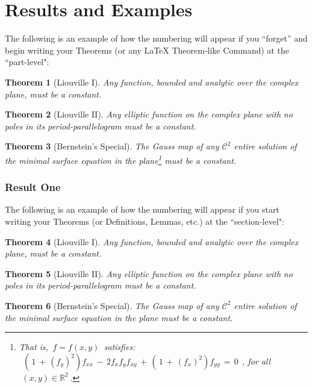 \documentclass[11pt]{gthesis2}  %
\newtheorem{theorem}{Theorem}[subsection]
\newcommand{\rtwo}{\ensuremath{\mathbb{R}^{2}}}
\begin{document}
\part{Results and Examples}
\label{part:rande}
%
The following is an example of how the numbering will appear if
you ``forget'' and begin writing your Theorems (or any \LaTeX\;
Theorem-like Command) at the ``part-level":
%
\begin{theorem}[Liouville I] Any function, bounded and analytic over the
complex plane, must be a constant.
\end{theorem}
%
\begin{theorem}[Liouville II] Any elliptic function on the complex
plane with no poles in its period-parallelogram must be a
constant.
\end{theorem}
%
\begin{theorem}[Bernstein's Special] The Gauss map of any
$\mathcal{C}^{2}$ entire solution of the minimal surface equation
in the plane\footnote{That is, $\,f = f(x,y)\,$ satisfies:
$\,\;(\,1\,+\, (f_{y})^{2})f_{xx}\, -\, 2f_{x}f_{y}f_{xy}
\,+\,(\,1\,+\, (f_{x})^{2})f_{yy} \,=\,0\,\;$, \;for all
$\,\,(x,y)\in\rtwo\,$.} must be a constant.
\end{theorem}
%
%
\section{Result One}
\label{sec:result1}
%
The following is an example of how the numbering will appear if
you start writing your Theorems (or Definitions, Lemmas, etc.) at
the ``section-level":
%
\begin{theorem}[Liouville I] Any function, bounded and analytic over the
complex plane, must be a constant.
\end{theorem}
%
\begin{theorem}[Liouville II] Any elliptic function on the complex
plane with no poles in its period-parallelogram must be a
constant.
\end{theorem}
%
\begin{theorem}[Bernstein's Special] The Gauss map of any
$\mathcal{C}^{2}$ entire solution of the minimal surface equation
in the plane must be a constant.
\end{theorem}
%
\newpage
%
\end{document}
